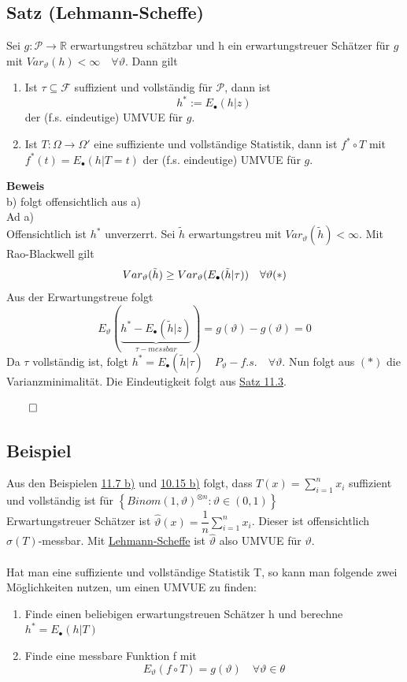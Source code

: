 \documentclass[german,10pt,oneside, fleqn, a4paper]{article}
\newcommand {\R}	{\mathbb{R}}
\newcommand{\ra}{\rightarrow}
\newcommand{\sm}[2][\infty]{\sum\limits_{#2}^{#1}}
\newcommand{\brac}[1]{\left\lbrace #1\right\rbrace}
\newcommand{\QED}{\begin{flushright}$\qed$\end{flushright}}
\newcommand{\mc}[1]{\mathcal{#1}}
\newcommand{\beweis}{\textbf{Beweis}\\}
\newcommand{\1}[1]{1_{#1}}
\newcommand{\2}[1]{\1{\brac{#1}}}
\newcommand{\f}{\mc{F}}
\newcommand{\sumi}{\sm[n]{i=1}}
\newcommand{\stuff}{{\otimes n}}
\begin{document}
\subsection{Satz (Lehmann-Scheffe)}
\label{11.8}
Sei $g:\mc{P}\ra\R$ erwartungstreu schätzbar und h ein erwartungstreuer Schätzer für $g$ mit $Var_\vartheta(h)<\infty\quad\forall\vartheta$. Dann gilt\begin{enumerate}[label=(\alph*)]
\item Ist $\tau\subseteq\f$ suffizient und vollständig für $\mc{P}$, dann ist \[
h^*:=E_\bullet(h|z)\]
der (f.s. eindeutige) UMVUE für $g$.
\item Ist $T:\Omega\ra\Omega'$ eine suffiziente und vollständige Statistik, dann ist $f^*\circ T$ mit $f^*(t)=E_\bullet(h|T=t)$ der (f.s. eindeutige) UMVUE für $g$.
\end{enumerate}
\beweis
b) folgt offensichtlich aus a)\\
Ad a)\\
Offensichtlich ist $h^*$ unverzerrt. Sei $\tilde{h}$ erwartungstreu mit $Var_\vartheta(\tilde{h})<\infty$. Mit Rao-Blackwell gilt \[
Var_\vartheta(\tilde{h})\geq Var_\vartheta(E_\bullet(\tilde{h}|\tau))\quad\forall\vartheta\hfill(*)\]
Aus der Erwartungstreue folgt \[
E_\vartheta(\underbrace{h^*-E_\bullet(\tilde{h}|z)}_{\tau-messbar})=g(\vartheta)-g(\vartheta)=0\]
Da $\tau$ vollständig ist, folgt $h^*=E_\bullet(\tilde{h}|\tau)\quad P_\vartheta-f.s.\quad\forall\vartheta$. Nun folgt aus $(*)$ die Varianzminimalität. Die Eindeutigkeit folgt aus \hyperref[11.3]{Satz 11.3}.\QED


\subsection{Beispiel}
\label{11.9}
Aus den Beispielen \hyperref[11.7]{11.7 b)} und \hyperref[10.15]{10.15 b)} folgt, dass $T(x)=\sumi x_i$ suffizient und vollständig ist für $\brac{Binom(1,\vartheta)^\stuff:\vartheta\in(0,1)}$\\
Erwartungstreuer Schätzer ist $\widehat{\vartheta}(x)=\dfrac{1}{n}\sumi x_i$. Dieser ist offensichtlich $\sigma(T)$-messbar. Mit \hyperref[11.8]{Lehmann-Scheffe} ist $\widehat{\vartheta}$ also UMVUE für $\vartheta$.\\
\\
Hat man eine suffiziente und vollständige Statistik T, so kann man folgende zwei Möglichkeiten nutzen, um einen UMVUE zu finden:\begin{enumerate}[label=(\roman*)]
\item Finde einen beliebigen erwartungstreuen Schätzer h und berechne\\ $h^*=E_\bullet(h|T)$
\item Finde eine messbare Funktion f mit \[E_\vartheta(f\circ T)=g(\vartheta)\quad\forall\vartheta\in\theta\]
\end{enumerate}
\end{document}
